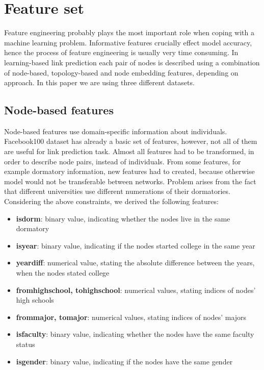 \documentclass[9pt,twocolumn,twoside]{pnas-new}
\begin{document}
\section*{Feature set}

Feature engineering probably plays the most important role when coping with a machine learning problem. Informative features crucially effect model accuracy, hence the process of feature engineering is usually very time consuming. In learning-based link prediction each pair of nodes is described using a combination of node-based, topology-based and node embedding features, depending on approach. In this paper we are using three different datasets.


\subsection*{Node-based features}

Node-based features use domain-specific information about individuals. Facebook100 dataset has already a basic set of features, however, not all of them are useful for link prediction task. Almost all features had to be transformed, in order to describe node pairs, instead of individuals. From some features, for example dormatory information, new features had to created, because otherwise model would not be transferable between networks. Problem arises from the fact that different universities use different numerations of their dormatories. Considering the above constraints, we derived the following features:

\begin{itemize}
    \item \textbf{is\textunderscore dorm}: binary value, indicating whether the nodes live in the same dormatory
    \item \textbf{is\textunderscore year}: binary value, indicating if the nodes started college in the same year
    \item \textbf{year\textunderscore diff}: numerical value, stating the absolute difference between the years, when the nodes stated college 
    \item \textbf{from\textunderscore high\textunderscore school, to\textunderscore high\textunderscore school}: numerical values, stating indices of nodes' high schools 
    \item \textbf{from\textunderscore major, to\textunderscore major}: numerical values, stating indices of nodes' majors
    \item \textbf{is\textunderscore faculty}: binary value, indicating whether the nodes have the same faculty status
    \item \textbf{is\textunderscore gender}: binary value, indicating if the nodes have the same gender
\end{itemize}
\end{document}
